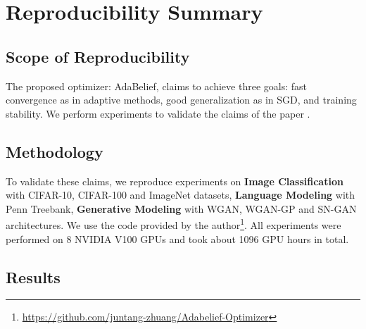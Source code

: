 \section*{\centering Reproducibility Summary}


\subsection*{Scope of Reproducibility}

The proposed optimizer: AdaBelief, claims to achieve three goals: fast convergence as in adaptive methods, good generalization as in SGD, and training stability. We perform experiments to validate the claims of the paper \cite{zhuang_adabelief_2020}.

\subsection*{Methodology}

To validate these claims, we reproduce experiments on \textbf{Image Classification} with CIFAR-10, CIFAR-100 and ImageNet datasets, \textbf{Language Modeling} with Penn Treebank, \textbf{Generative Modeling} with WGAN, WGAN-GP and SN-GAN architectures. We use the code provided by the author\footnote{\href{https://github.com/juntang-zhuang/Adabelief-Optimizer}{https://github.com/juntang-zhuang/Adabelief-Optimizer}}. All experiments were performed on 8 NVIDIA V100 GPUs and took about 1096 GPU hours in total.


\subsection*{Results}

